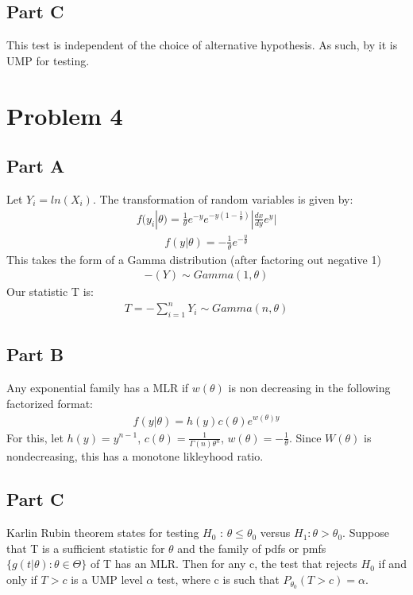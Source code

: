 \documentclass{article}
\begin{document}
\subsection*{Part C}
This test is independent of the choice of alternative hypothesis. As such, by it is UMP for testing.

\clearpage

\section*{Problem 4}
\subsection*{Part A}
Let $Y_i=ln(X_i)$. The transformation of random variables is given by:
\begin{align*}
f(y_i|\theta) = \frac{1}{\theta} e^{-y} e^{-y(1-\frac{1}{\theta})} |\frac{dx}{dy}e^y|
\end{align*}
\begin{align*}
f(y|\theta) = - \frac{1}{\theta} e^{-\frac{y}{\theta}}
\end{align*}
This takes the form of a Gamma distribution (after factoring out negative 1)
\begin{align*}
-(Y) \sim Gamma(1,\theta)
\end{align*}
Our statistic T is:
\begin{align*}
\boxed{ T = - \sum_{i=1}^{n} Y_i \sim Gamma(n,\theta) }
\end{align*}

\subsection*{Part B}
Any exponential family has a MLR if $w(\theta)$ is non decreasing in the following factorized format:
\begin{align*}
f(y|\theta) = h(y)c(\theta) e^{w(\theta) y}
\end{align*}
For this, let $h(y)=y^{n-1}$, $c(\theta) = \frac{1}{\Gamma(n) \theta^n}$, $w(\theta)= -\frac{1}{\theta}$. Since $W(\theta)$ is nondecreasing, this has a monotone likleyhood ratio.

\subsection*{Part C}
Karlin Rubin theorem states for testing $H_0$ : $\theta \leq \theta_0$ versus $H_1 : \theta > \theta_0$. Suppose that T is a sufficient statistic for $\theta$ and the family of pdfs or pmfs $\{g(t|\theta) : \theta \in \Theta \}$ of T has an MLR. Then for any c, the test that rejects $H_0$ if and only if $T > c$ is a UMP level $\alpha$ test, where c is such that $P_{\theta_0} (T > c) = \alpha$.
\end{document}
